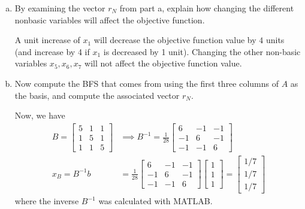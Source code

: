 \documentclass{article}
\begin{document}
\begin{enumerate}
\begin{enumerate}[a)]
\begin{soln}
				\end{soln}

			\item By examining the vector $r_N$ from part a, explain how changing the different nonbasic variables will affect the objective function.
				\begin{soln}
					A unit increase of $x_1$ will decrease the objective function value by $4$ units (and increase by 4 if $x_1$ is decreased by 1 unit). Changing the other non-basic variables $x_5, x_6, x_7$ will not affect the objective function value.
					
				\end{soln}

			\item Now compute the BFS that comes from using the first three columns of $A$ as the basis, and compute the associated vector $r_N.$
				\begin{soln}
					Now, we have 
					\begin{align*}
						B=\begin{bmatrix}
							5 & 1 & 1 \\
							1 & 5 & 1 \\
							1 & 1 & 5
						\end{bmatrix}&\implies B^{-1} = \frac{1}{28}\begin{bmatrix}
							6 & -1 & -1 \\
							-1 & 6 & -1 \\
							-1 & -1 & 6
						\end{bmatrix} \\
						x_B =B^{-1}b &= \frac{1}{28}\begin{bmatrix}
							6 & -1 & -1 \\
							-1 & 6 & -1 \\
							-1 & -1 & 6
						\end{bmatrix} \begin{bmatrix}
							1 \\ 1 \\ 1
						\end{bmatrix} = \begin{bmatrix}
							1/7 \\ 1/7 \\ 1/7
						\end{bmatrix}
					\end{align*} where the inverse $B^{-1}$ was calculated with MATLAB.


\end{soln}
\end{enumerate}
\end{enumerate}
\end{document}
